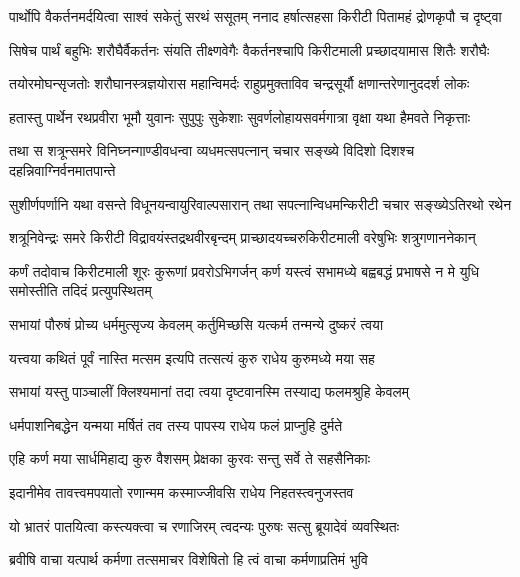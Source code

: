 \twolineshloka
{पार्थोपि वैकर्तनमर्दयित्वा साश्वं सकेतुं सरथं ससूतम्}
{ननाद हर्षात्सहसा किरीटी पितामहं द्रोणकृपौ च दृष्ट्वा}


\twolineshloka
{सिषेच पार्थं बहुभिः शरौघैर्वैकर्तनः संयति तीक्ष्णवेगैः}
{वैकर्तनश्चापि किरीटमाली प्रच्छादयामास शितैः शरौघैः}


\twolineshloka
{तयोरमोघन्सृजतोः शरौघानस्त्रज्ञयोरास महान्विमर्दः}
{राहुप्रमुक्ताविव चन्द्रसूर्यौ क्षणान्तरेणानुददर्श लोकः}


\twolineshloka
{हतास्तु पार्थेन रथप्रवीरा भूमौ युवानः सुपुपुः सुकेशाः}
{सुवर्णलोहायसवर्मगात्रा वृक्षा यथा हैमवते निकृत्ताः}


\twolineshloka
{तथा स शत्रून्समरे विनिघ्नन्गाण्डीवधन्वा व्यधमत्सपत्नान्}
{चचार सङ्ख्ये विदिशो दिशश्च दहन्निवाग्निर्वनमातपान्ते}


\twolineshloka
{सुशीर्णपर्णानि यथा वसन्ते विधूनयन्वायुरिवाल्पसारान्}
{तथा सपत्नान्विधमन्किरीटी चचार सङ्ख्येऽतिरथो रथेन}


\twolineshloka
{शत्रूनिवेन्द्रः समरे किरीटी विद्रावयंस्तद्रथवीरबृन्दम्}
{प्राच्छादयच्चरुकिरीटमाली वरेषुभिः शत्रुगणाननेकान्}


\onelineshloka
{कर्णं तदोवाच किरीटमाली शूरः कुरूणां प्रवरोऽभिगर्जन्}
\twolineshloka
{कर्ण यस्त्वं सभामध्ये बह्वबद्धं प्रभाषसे}
{न मे युधि समोस्तीति तदिदं प्रत्युपस्थितम्}


\twolineshloka
{सभायां पौरुषं प्रोच्य धर्ममुत्सृज्य केवलम्}
{कर्तुमिच्छसि यत्कर्म तन्मन्ये दुष्करं त्वया}



\twolineshloka
{यत्त्वया कथितं पूर्वं नास्ति मत्सम इत्यपि}
{तत्सत्यं कुरु राधेय कुरुमध्ये मया सह}


\twolineshloka
{सभायां यस्तु पाञ्चालीं क्लिश्यमानां तदा त्वया}
{दृष्टवानस्मि तस्याद्य फलमश्रुहि केवलम्}


\twolineshloka
{धर्मपाशनिबद्धेन यन्मया मर्षितं तव}
{तस्य पापस्य राधेय फलं प्राप्नुहि दुर्मते}


\twolineshloka
{एहि कर्ण मया सार्धमिहाद्य कुरु वैशसम्}
{प्रेक्षका कुरवः सन्तु सर्वे ते सहसैनिकाः}


\twolineshloka
{इदानीमेव तावत्त्वमपयातो रणान्मम}
{कस्माज्जीवसि राधेय निहतस्त्वनुजस्तव}


\twolineshloka
{यो भ्रातरं पातयित्वा कस्त्यक्त्वा च रणाजिरम्}
{त्वदन्यः पुरुषः सत्सु ब्रूयादेवं व्यवस्थितः}




\twolineshloka
{ब्रवीषि वाचा यत्पार्थ कर्मणा तत्समाचर}
{विशेषितो हि त्वं वाचा कर्मणाप्रतिमं भुवि}


